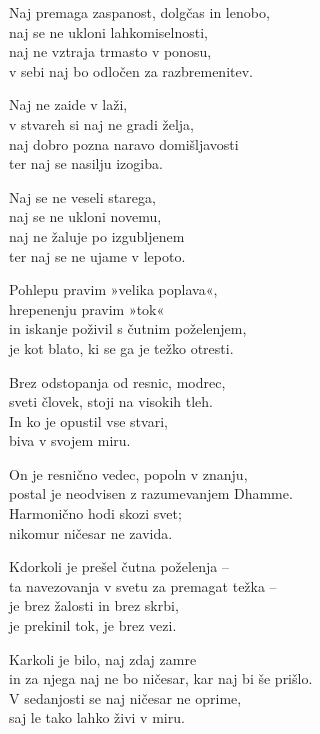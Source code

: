 Naj premaga zaspanost, dolgčas in lenobo,\\
naj se ne ukloni lahkomiselnosti,\\
naj ne vztraja trmasto v ponosu,\\
v sebi naj bo odločen za razbremenitev.

Naj ne zaide v laži,\\
v stvareh si naj ne gradi želja,\\
naj dobro pozna naravo domišljavosti\\
ter naj se nasilju izogiba.

\clearpage

Naj se ne veseli starega,\\
naj se ne ukloni novemu,\\
naj ne žaluje po izgubljenem\\
ter naj se ne ujame v lepoto.

Pohlepu pravim »velika poplava«,\\
hrepenenju pravim »tok«\\
in iskanje poživil s čutnim poželenjem,\\
je kot blato, ki se ga je težko otresti.

Brez odstopanja od resnic, modrec,\\
sveti človek, stoji na visokih tleh.\\
In ko je opustil vse stvari,\\
biva v svojem miru.

On je resnično vedec, popoln v znanju,\\
postal je neodvisen z razumevanjem Dhamme.\\
Harmonično hodi skozi svet;\\
nikomur ničesar ne zavida.

Kdorkoli je prešel čutna poželenja --\\
ta navezovanja v svetu za premagat težka --\\
je brez žalosti in brez skrbi,\\
je prekinil tok, je brez vezi.


\clearpage

Karkoli je bilo, naj zdaj zamre\\
in za njega naj ne bo ničesar, kar naj bi še prišlo.\\
V sedanjosti se naj ničesar ne oprime,\\
saj le tako lahko živi v miru.

